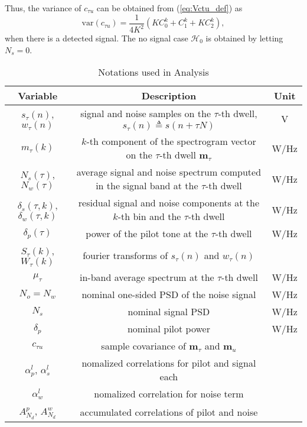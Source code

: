 \documentclass[draftclsnofoot,onecolumn,12pt]{IEEEtran}
\begin{document}
  Thus, the variance of $c_{\tau u}$ can be obtained from (\ref{eq:Vctu_def}) as
  \begin{equation}
    \mathrm{var}(c_{\tau u}) = \frac{1}{4K^2} \left( KC_0^k + C_1^k + KC_2^k \right),
  \end{equation}
  when there is a detected signal. The no signal case $\mathcal{H}_0$ is obtained by letting $N_s = 0$.








\newpage

\begin{table}\centering
  \caption{Notations used in Analysis}
  \label{tbl:Notations}
  \begin{tabular}{|c|c|c|}
    \hline
	Variable & Description & Unit \\ \hline
$s_\tau(n)$, $w_\tau(n)$ & signal and noise samples on the $\tau$-th dwell, $s_\tau(n) \triangleq s(n+\tau N)$ & V \\
	$m_\tau(k)$ & $k$-th component of the spectrogram vector on the $\tau$-th dwell $\mathbf{m}_\tau$ & W/Hz \\
	$N_s(\tau)$, $N_w(\tau)$ & average signal and noise spectrum computed in the signal band at the $\tau$-th dwell & W/Hz \\
	$\delta_s(\tau,k)$, $\delta_w(\tau,k)$ & residual signal and noise components at the $k$-th bin and the $\tau$-th dwell & W/Hz \\
	$\delta_p(\tau)$  & power of the pilot tone at the $\tau$-th dwell & W/Hz \\
	$S_\tau(k)$, $W_\tau(k)$ & fourier transforms of $s_\tau(n)$ and $w_\tau(n)$ & \\
	$\mu_\tau$ & in-band average spectrum at the $\tau$-th dwell & W/Hz \\
	$N_o = N_w$ & nominal one-sided PSD of the noise signal & W/Hz \\
	$N_s$ 	   & nominal signal PSD & W/Hz \\
	$\delta_p$ & nominal pilot power & W/Hz \\
	$c_{\tau u}$ & sample covariance of $\mathbf{m}_\tau$ and $\mathbf{m}_u$ & \\
	$\alpha_p^l$, $\alpha_s^l$ & nomalized correlations for pilot and signal each & \\
	$\alpha_w^l$ & nomalized correlation for noise term & \\
	$A_{N_d}^p$, $A_{N_d}^w$ & accumulated correlations of pilot and noise & \\ \hline
  \end{tabular}
\end{table}
\end{document}
